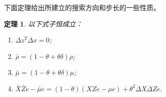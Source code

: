 \documentclass{ctexart}
\numberwithin{equation}{section} %
\newtheorem{theorem}{定理}[section]
\begin{document}
下面定理给出所建立的搜索方向和步长的一些性质。
\begin{theorem}
	\label{th: stepDirection}
	以下式子恒成立：
	\begin{enumerate}[(1)]
			\item \label{th: stepDirection.a} $ \Delta z^{T}\Delta x = 0 $; 
			\item \label{th: stepDirection.b} $ \bar{\rho} = \left(1 - \theta + \theta\delta\right)\rho $; 
			\item \label{th: stepDirection.c} $ \bar{\mu} = \left(1 - \theta + \theta\delta\right)\mu $; 
			\item \label{th: stepDirection.d} $ \bar{X}\bar{Z}e - \bar{\mu}e = \left(1 - \theta\right)\left(XZe - \mu e\right) + {\theta}^2\Delta X\Delta Ze $.
	\end{enumerate}
\end{theorem}
\end{document}
